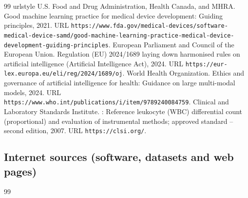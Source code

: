 {\begin{thebibliography}{99}
\providecommand{\natexlab}[1]{#1}
\providecommand{\url}[1]{\texttt{#1}}
\expandafter\ifx\csname urlstyle\endcsname\relax
  \providecommand{\doi}[1]{doi: #1}\else
  \providecommand{\doi}{doi: \begingroup \urlstyle{rm}\Url}\fi
\setcounter{enumiv}{28}\setcounter{NAT@ctr}{28}
{U.S. Food and Drug Administration, Health Canada, and MHRA}.
\newblock Good machine learning practice for medical device development:
  Guiding principles, 2021.
\newblock URL
  \url{https://www.fda.gov/medical-devices/software-medical-device-samd/good-machine-learning-practice-medical-device-development-guiding-principles}.
{European Parliament and Council of the European Union}.
\newblock Regulation ({EU}) 2024/1689 laying down harmonised rules on
  artificial intelligence ({Artificial Intelligence Act}), 2024.
\newblock URL \url{https://eur-lex.europa.eu/eli/reg/2024/1689/oj}.
{World Health Organization}.
\newblock Ethics and governance of artificial intelligence for health: Guidance
  on large multi-modal models, 2024.
\newblock URL \url{https://www.who.int/publications/i/item/9789240084759}.
{Clinical and Laboratory Standards Institute}.
: Reference leukocyte ({WBC}) differential count
  (proportional) and evaluation of instrumental methods; approved standard --
  second edition, 2007.
\newblock URL \url{https://clsi.org/}.
\end{thebibliography}

\subsection*{Internet sources (software, datasets and web pages)}
\begin{thebibliography}{99}


\end{thebibliography}}
